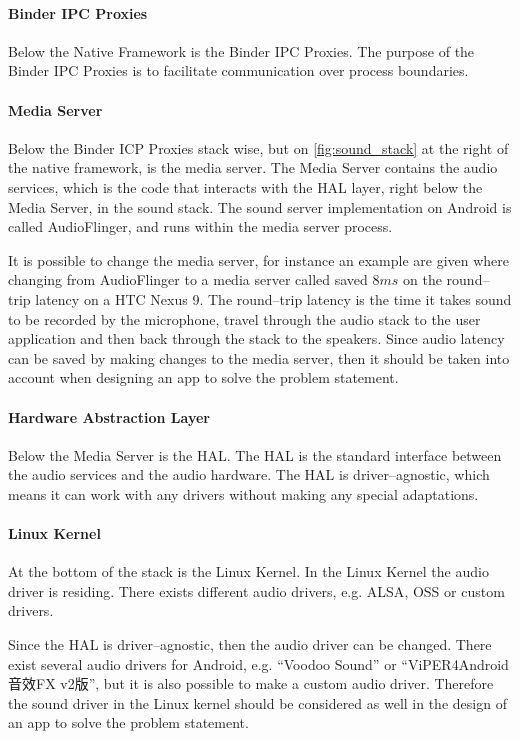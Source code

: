 \paragraph{Binder IPC Proxies}
Below the Native Framework is the Binder IPC Proxies.
The purpose of the Binder IPC Proxies is to facilitate communication over process boundaries.

\paragraph{Media Server}
Below the Binder ICP Proxies stack wise, but on \cref{fig:sound_stack} at the right of the native framework, is the media server.
The Media Server contains the audio services, which is the code that interacts with the \ac{HAL} layer,
right below the Media Server, in the sound stack.
The sound server implementation on Android is called AudioFlinger, and runs within the media server process\cite{audioflinger}.

It is possible to change the media server, 
for instance an example are given where changing from AudioFlinger to a media server called  saved $8 ms$ on the round--trip latency on a HTC Nexus 9\cite{superpowered_8ms}.
The round--trip latency is the time it takes sound to be recorded by the microphone,
travel through the audio stack to the user application and then back through the stack to the speakers\cite{superpowered_8ms}.
Since audio latency can be saved by making changes to the media server,
then it should be taken into account when designing an app to solve the problem statement.

\paragraph{Hardware Abstraction Layer}
Below the Media Server is the \ac{HAL}.
The \ac{HAL} is the standard interface between the audio services and the audio hardware.
The \ac{HAL} is driver--agnostic, which means it can work with any drivers without making any special adaptations.

\paragraph{Linux Kernel}
At the bottom of the stack is the Linux Kernel.
In the Linux Kernel the audio driver is residing.
There exists different audio drivers, e.g. \ac{ALSA}, \ac{OSS} or custom drivers.

Since the \ac{HAL} is driver--agnostic, then the audio driver can be changed. 
There exist several audio drivers for Android, e.g. ``Voodoo Sound'' or ``ViPER4Android音效FX v2版'',
but it is also possible to make a custom audio driver\cite{voodoo_sound}\cite{viper4_android}.
Therefore the sound driver in the Linux kernel should be considered as well in the design of an app to solve the problem statement.

